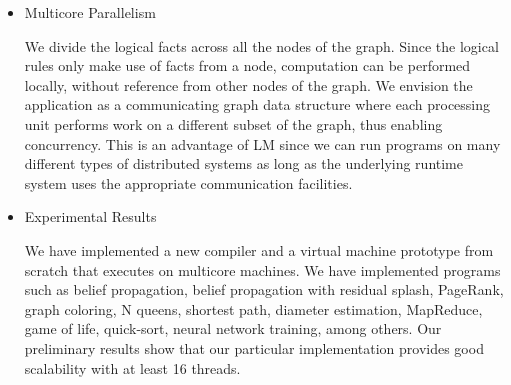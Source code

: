 \begin{itemize}
   \item Multicore Parallelism
   
   We divide the logical facts across all the nodes of the graph. Since the
   logical rules only make use of facts from a node, computation can be
   performed locally, without reference from other nodes of the graph.
   We envision the application as a communicating graph data structure where
   each processing unit performs work on a different subset of the graph, thus
   enabling concurrency. This is an advantage of LM since we can run programs on
   many different types of distributed systems as long as the underlying runtime
   system uses the appropriate communication facilities.

   \item Experimental Results

   We have implemented a new compiler and a virtual machine prototype from
   scratch that executes on multicore machines.  We have implemented programs
   such as belief propagation, belief propagation with residual splash,
   PageRank, graph coloring, N queens, shortest path, diameter estimation,
   MapReduce, game of life, quick-sort, neural network training, among others.
   Our preliminary results show that our particular implementation provides
   good scalability with at least 16 threads.
   
\end{itemize}
